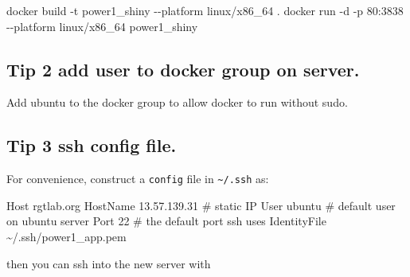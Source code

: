 \documentclass[
  letterpaper,
  DIV=11,
  numbers=noendperiod,
  oneside]{scrartcl}
\newenvironment{Shaded}{\begin{snugshade}}{\end{snugshade}}
\newcommand{\AttributeTok}[1]{\textcolor[rgb]{0.40,0.45,0.13}{#1}}
\newcommand{\CommentTok}[1]{\textcolor[rgb]{0.37,0.37,0.37}{#1}}
\newcommand{\ExtensionTok}[1]{\textcolor[rgb]{0.00,0.23,0.31}{#1}}
\newcommand{\FunctionTok}[1]{\textcolor[rgb]{0.28,0.35,0.67}{#1}}
\newcommand{\NormalTok}[1]{\textcolor[rgb]{0.00,0.23,0.31}{#1}}
\newcommand{\VariableTok}[1]{\textcolor[rgb]{0.07,0.07,0.07}{#1}}
\begin{document}
\begin{Shaded}
\begin{Highlighting}[]
\ExtensionTok{docker}\NormalTok{ build }\AttributeTok{{-}t}\NormalTok{ power1\_shiny }\AttributeTok{{-}{-}platform}\NormalTok{ linux/x86\_64 .}
\ExtensionTok{docker}\NormalTok{ run }\AttributeTok{{-}d} \AttributeTok{{-}p}\NormalTok{ 80:3838 }\AttributeTok{{-}{-}platform}\NormalTok{ linux/x86\_64 power1\_shiny}
\end{Highlighting}
\end{Shaded}

\hypertarget{tip-2-add-user-to-docker-group-on-server.}{%
\subsection{Tip 2 add user to docker group on
server.}\label{tip-2-add-user-to-docker-group-on-server.}}

Add ubuntu to the docker group to allow docker to run without sudo.

\begin{Shaded}
\end{Shaded}

\hypertarget{tip-3-ssh-config-file.}{%
\subsection{Tip 3 ssh config file.}\label{tip-3-ssh-config-file.}}

For convenience, construct a \texttt{config} file in
\texttt{\textasciitilde{}/.ssh} as:

\begin{Shaded}
\begin{Highlighting}[]



\ExtensionTok{Host}\NormalTok{ rgtlab.org}
\ExtensionTok{HostName}\NormalTok{ 13.57.139.31 }\CommentTok{\# static IP}
\ExtensionTok{User}\NormalTok{ ubuntu }\CommentTok{\# default user on ubuntu server}
\ExtensionTok{Port}\NormalTok{ 22  }\CommentTok{\# the default port ssh uses}
\ExtensionTok{IdentityFile}\NormalTok{ \textasciitilde{}/.ssh/power1\_app.pem}
\end{Highlighting}
\end{Shaded}

then you can ssh into the new server with
\end{document}
